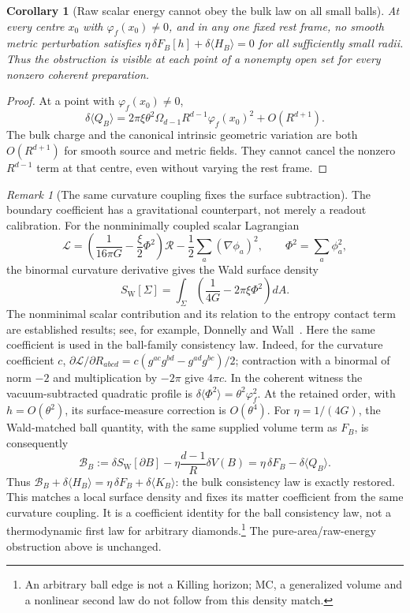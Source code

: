 \documentclass[12pt]{article}
\newtheorem{corollary}[theorem]{Corollary}
\theoremstyle{definition}
\theoremstyle{remark}
\newtheorem{remark}[theorem]{Remark}
\newcommand{\ev}[1]{\langle #1\rangle}
\begin{document}
\begin{corollary}[Raw scalar energy cannot obey the bulk law on all small balls]\label{cor:edgeobstruction}
At every centre \(x_0\) with \(\varphi_f(x_0)\ne0\), and in any one fixed rest frame,
no smooth metric perturbation satisfies
\(\eta\,\delta F_B[h]+\delta\ev{H_B}=0\) for all sufficiently small radii.
Thus the obstruction is visible at each point of a nonempty open set for every
nonzero coherent preparation.
\end{corollary}

\begin{proof}
At a point with \(\varphi_f(x_0)\ne0\),
\[
\delta\ev{Q_B}
=2\pi\xi\theta^2\Omega_{d-1}R^{d-1}\varphi_f(x_0)^2+O(R^{d+1}).
\]
The bulk charge and the canonical intrinsic geometric variation are both
\(O(R^{d+1})\) for smooth source and metric fields. They cannot cancel the nonzero
\(R^{d-1}\) term at that centre, even without varying the rest frame.
\end{proof}

\begin{remark}[The same curvature coupling fixes the surface subtraction]\label{rem:waldedge}
The boundary coefficient has a gravitational counterpart, not merely a readout
calibration. For the nonminimally coupled scalar Lagrangian
\[
\mathcal L=\left(\frac{1}{16\pi G}-\frac{\xi}{2}\Phi^2\right)\mathcal R
-\frac12\sum_a(\nabla\phi_a)^2,\qquad \Phi^2=\sum_a\phi_a^2,
\]
the binormal curvature derivative gives the Wald surface density
\cite[Eqs.~(53), (93)]{IyerWald1994}
\[
S_{\mathrm W}[\Sigma]=\int_\Sigma
\left(\frac{1}{4G}-2\pi\xi\Phi^2\right)dA.
\]
The nonminimal scalar contribution and its relation to the entropy contact term
are established results; see, for example, Donnelly and Wall~\cite[Eq.~(5),
Sec.~II.A]{DonnellyWall2012}. Here the same coefficient is used in the ball-family
consistency law.
Indeed, for the curvature coefficient \(c\),
\(\partial\mathcal L/\partial R_{abcd}
=c(g^{ac}g^{bd}-g^{ad}g^{bc})/2\);
contraction with a binormal of norm \(-2\) and multiplication by \(-2\pi\)
give \(4\pi c\). In the coherent witness the vacuum-subtracted quadratic profile is
\(\delta\ev{\Phi^2}=\theta^2\varphi_f^2\). At the retained order, with
\(h=O(\theta^2)\), its surface-measure correction is \(O(\theta^4)\).
For \(\eta=1/(4G)\), the Wald-matched ball quantity, with the same supplied
volume term as \(F_B\), is consequently
\[
\mathcal B_B:=\delta S_{\mathrm W}[\partial B]
-\eta\frac{d-1}{R}\delta V(B)
=\eta\,\delta F_B-\delta\ev{Q_B}.
\]
Thus \(\mathcal B_B+\delta\ev{H_B}
=\eta\,\delta F_B+\delta\ev{K_B}\): the bulk consistency law is exactly restored.
This matches a local surface density and fixes its matter coefficient from the same
curvature coupling. It is a coefficient identity for the ball consistency law, not
a thermodynamic first law for arbitrary diamonds.\footnote{An arbitrary ball edge
is not a Killing horizon; MC, a generalized volume and a nonlinear second law do
not follow from this density match.}
The pure-area/raw-energy obstruction above is unchanged.
\end{remark}
\end{document}
